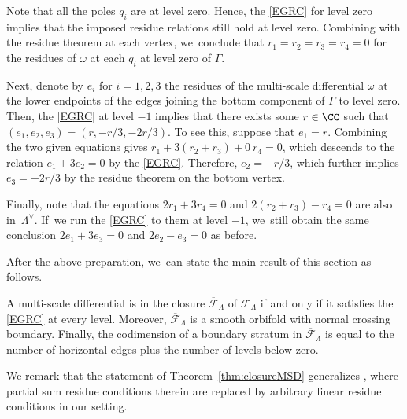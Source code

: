 \begin{ex}
Note that all the poles $q_i$ are at level zero. Hence,
the \ref{EGRC} for level zero implies that the imposed residue relations still hold at level zero. Combining with the residue theorem at each vertex, we~conclude that $r_1 = r_{2}=r_{3}= r_4 = 0$ for the residues of $\omega$ at each $q_i$ at level zero of $\Gamma$.

Next, denote by $e_{i}$ for $i=1,2,3$ the residues of the multi-scale differential $\omega$ at the lower endpoints of the edges joining the bottom component of $\Gamma$ to level zero. Then, the \ref{EGRC} at level $-1$ implies
that there exists some $r\in\CC$ such that $(e_{1},e_{2},e_{3}) = (r,-r/3,-2r/3)$. To see this, suppose that $e_{1}=r$. Combining the two given equations gives $r_1 + 3(r_2 + r_3) + 0\ r_4 = 0$, which descends to the relation $e_1 + 3e_2 = 0$ by the \ref{EGRC}. Therefore, $e_2 = - r/3 $, which further implies $e_3 = -2r/3$ by the residue theorem on the bottom vertex.

Finally, note that the equations $2r_1 + 3r_4 = 0$ and
$2(r_2+r_3) - r_4 = 0$ are also in~$\Lambda^{\vee}$. If~we run the \ref{EGRC} to them at level $-1$, we~still obtain the same conclusion $2e_1 + 3e_3 = 0$ and
$2e_2 - e_3 = 0$ as before.
\end{ex}

After the above preparation, we~can state the main result of this section as follows.
\begin{thm}\label{thm:closureMSD}
A multi-scale differential is in the closure $\overline{\mathcal{F}}_{\Lambda}$
of $\mathcal{F}_{\Lambda}$ if and only if it satisfies the \ref{EGRC} at every level.
Moreover, $\overline{\mathcal{F}}_{\Lambda}$ is a smooth orbifold with normal crossing boundary. Finally, the codimension of a boundary stratum in $\overline{\mathcal{F}}_{\Lambda}$ is equal to the number of horizontal edges plus the number of levels below zero.
\end{thm}

We remark that the statement of Theorem~\ref{thm:closureMSD} generalizes \cite[Prop.\,4.2]{CMZ}, where partial sum residue conditions therein are replaced by arbitrary linear residue conditions in our setting.

